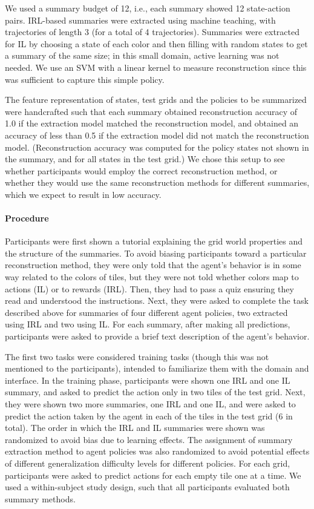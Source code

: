 \documentclass{article}
\begin{document}
We used a summary budget of 12, i.e., each summary showed 12 state-action pairs. IRL-based summaries were extracted using machine teaching, with trajectories of length 3 (for a total of 4 trajectories). Summaries were extracted for IL by choosing a state of each color and then filling with random states to get a summary of the same size; in this small domain, active learning was not needed. We use an SVM with a linear kernel to measure reconstruction since this was sufficient to capture this simple policy.

The feature representation of states, test grids and the policies to be summarized were handcrafted such that each summary obtained reconstruction accuracy of 1.0 if the extraction model matched the reconstruction model, and obtained an accuracy of less than 0.5 if the extraction model did not match the reconstruction model. (Reconstruction accuracy was computed for the policy states not shown in the summary, and for all states in the test grid.) We chose this setup to see whether participants would employ the correct reconstruction method, or whether they would use the same reconstruction methods for different summaries, which we expect to result in low accuracy.

\paragraph{Procedure} Participants were first shown a tutorial explaining the grid world properties and the structure of the summaries. To avoid biasing participants toward a particular reconstruction method, they were only told that the agent's behavior is in some way related to the colors of tiles, but they were not told whether colors map to actions (IL) or to rewards (IRL). Then, they had to pass a quiz ensuring they read and understood the instructions. Next, they were asked to complete the task described above for summaries of four different agent policies, two extracted using IRL and two using IL. For each summary, after making all predictions, participants were asked to provide a brief text description of the agent's behavior.

The first two tasks were considered training tasks (though this was not mentioned to the participants), intended to familiarize them with the domain and interface. In the training phase, participants were shown one IRL and one IL summary, and asked to predict the action only in two tiles of the test grid. Next, they were shown two more summaries, one IRL and one IL, and were asked to predict the action taken by the agent in each of the tiles in the test grid (6 in total). The order in which the  IRL and IL summaries were shown was randomized to avoid bias due to learning effects. The assignment of summary extraction method to agent policies was also randomized to avoid potential effects of different generalization difficulty levels for different policies. For each grid, participants were asked to predict actions for each empty tile one at a time. We used a within-subject study design, such that all participants evaluated both summary methods. 
\end{document}
